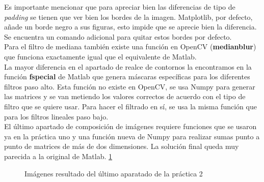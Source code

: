 \documentclass[a4paper,12pt]{report}
\begin{document}
Es importante mencionar que para apreciar bien las diferencias de tipo de \emph{padding} se tienen que ver bien los bordes de la imagen. Matplotlib, por defecto, añade un borde negro a sus figuras, esto impide que se aprecie bien la diferencia. Se encuentra un comando adicional para quitar estos bordes por defecto.\\

Para el filtro de mediana también existe una función en OpenCV (\textbf{medianblur}) que funciona exactamente igual que el equivalente de Matlab.\\

La mayor diferencia en el apartado de realce de contornos la encontramos en la función \textbf{fspecial} de Matlab que genera máscaras específicas para los diferentes filtros paso alto. Esta función no existe en OpenCV, se usa Numpy para generar las matrices y se van metiendo los valores correctos de acuerdo con el tipo de filtro que se quiere usar. Para hacer el filtrado en sí, se usa la misma función que para los filtros lineales paso bajo.\\

El último apartado de composición de imágenes requiere funciones que se usaron ya en la práctica uno y una función nueva de Numpy para realizar sumas punto a punto de matrices de más de dos dimensiones. La solución final queda muy parecida a la original de Matlab.
\ref {p2final}\\


\begin{figure}[!tbp]
  \centering
  \hfill
  \caption{Imágenes resultado del último aparatado de la práctica 2}
  \label{p2final}
\end{figure}
\end{document}
